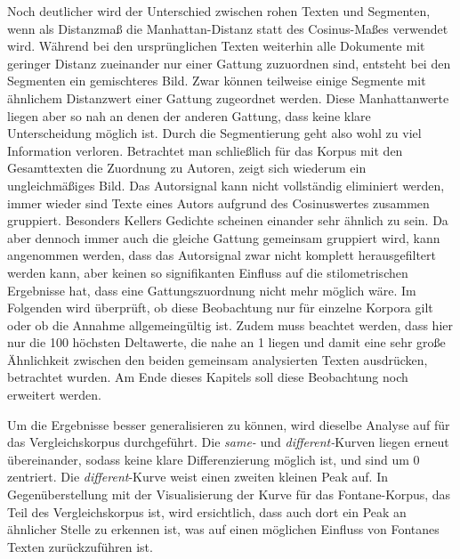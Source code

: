 \documentclass[a4paper,10p]{article}
\begin{document}
Noch deutlicher wird der Unterschied zwischen rohen Texten und Segmenten, wenn als Distanzmaß die Manhattan-Distanz statt des Cosinus-Maßes verwendet wird. Während bei den ursprünglichen Texten weiterhin alle Dokumente mit geringer Distanz zueinander nur einer Gattung zuzuordnen sind, entsteht bei den Segmenten ein gemischteres Bild. Zwar können teilweise einige Segmente mit ähnlichem Distanzwert einer Gattung zugeordnet werden. Diese Manhattanwerte liegen aber so nah an denen der anderen Gattung, dass keine klare Unterscheidung möglich ist. Durch die Segmentierung geht also wohl zu viel Information verloren. Betrachtet man schließlich für das Korpus mit den Gesamttexten die Zuordnung zu Autoren, zeigt sich wiederum ein ungleichmäßiges Bild. Das Autorsignal kann nicht vollständig eliminiert werden, immer wieder sind Texte eines Autors aufgrund des Cosinuswertes zusammen gruppiert. Besonders Kellers Gedichte scheinen einander sehr ähnlich zu sein. Da aber dennoch immer auch die gleiche Gattung gemeinsam gruppiert wird, kann angenommen werden, dass das Autorsignal zwar nicht komplett herausgefiltert werden kann, aber keinen so signifikanten Einfluss auf die stilometrischen Ergebnisse hat, dass eine Gattungszuordnung nicht mehr möglich wäre. Im Folgenden wird überprüft, ob diese Beobachtung nur für einzelne Korpora gilt oder ob die Annahme allgemeingültig ist. Zudem muss beachtet werden, dass hier nur die 100 höchsten Deltawerte, die nahe an 1 liegen und damit eine sehr große Ähnlichkeit zwischen den beiden gemeinsam analysierten Texten ausdrücken, betrachtet wurden. Am Ende dieses Kapitels soll diese Beobachtung noch erweitert werden. \par 

Um die Ergebnisse besser generalisieren zu können, wird dieselbe Analyse auf für das Vergleichskorpus durchgeführt. Die \textit{same-} und  \textit{different-}Kurven liegen erneut übereinander, sodass keine klare Differenzierung möglich ist, und sind um 0 zentriert. Die \textit{different}-Kurve weist einen zweiten kleinen Peak auf. In Gegenüberstellung mit der Visualisierung der Kurve für das Fontane-Korpus, das Teil des Vergleichskorpus ist, wird ersichtlich, dass auch dort ein Peak an ähnlicher Stelle zu erkennen ist, was auf einen möglichen Einfluss von Fontanes Texten zurückzuführen ist. \par 
\end{document}
